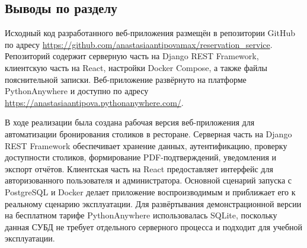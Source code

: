 \subsection{Выводы по разделу}
Исходный код разработанного веб-приложения размещён в репозитории GitHub по адресу \url{https://github.com/anastasiaantipovamax/reservation_service}. Репозиторий содержит серверную часть на Django REST Framework, клиентскую часть на React, настройки Docker Compose, а также файлы пояснительной записки. Веб-приложение развёрнуто на платформе PythonAnywhere и доступно по адресу \url{https://anastasiaantipova.pythonanywhere.com/}.

В ходе реализации была создана рабочая версия веб-приложения для автоматизации
бронирования столиков в ресторане. Серверная часть на Django REST Framework
обеспечивает хранение данных, аутентификацию, проверку доступности столиков,
формирование PDF-подтверждений, уведомления и экспорт отчётов. Клиентская часть на
React предоставляет интерфейс для авторизованного пользователя и администратора.
Основной сценарий запуска с PostgreSQL и Docker делает приложение воспроизводимым и
приближает его к реальному сценарию эксплуатации. Для развёртывания демонстрационной
версии на бесплатном тарифе PythonAnywhere использовалась SQLite, поскольку данная
СУБД не требует отдельного серверного процесса и подходит для учебной эксплуатации.
